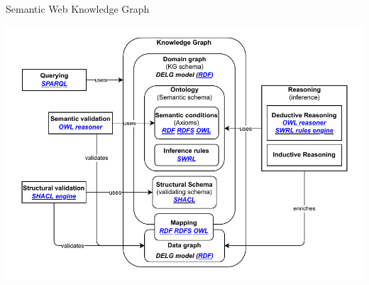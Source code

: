 


\begin{frame}[noframenumbering]{Semantic Web Knowledge Graph}
    
        \begin{center}
            \includegraphics[scale=0.6]{images/kg-def-technos.pdf} 
        \end{center}

\end{frame}


    


